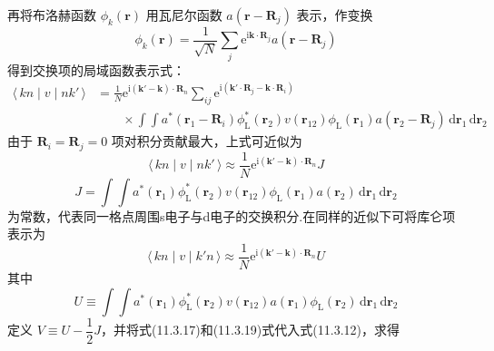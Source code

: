 再将布洛赫函数 $\phi_{k}(\boldsymbol{r})$ 用瓦尼尔函数 $a(\boldsymbol{r}-\boldsymbol{R}_{j})$ 表示，作变换
\begin{equation}
  \phi_{k}(\boldsymbol{r})=\frac{1}{\sqrt{N}}\sum_{j}
  \mathrm{e}^{\mathrm{i}\boldsymbol{k}\cdot\boldsymbol{R}_{j}}
  a(\boldsymbol{r}-\boldsymbol{R}_{j})
\end{equation}
得到交换项的局域函数表示式：
\begin{equation}
\begin{aligned}
  \langle\,kn\mid v\mid nk'\,\rangle
  &=\frac{1}{N}\mathrm{e}^{\mathrm{i}(\boldsymbol{k}'-\boldsymbol{k})\cdot\boldsymbol{R}_{n}}
  \sum_{ij}\mathrm{e}^{\mathrm{i}(\boldsymbol{k}'\cdot\boldsymbol{R}_{j}
  -\boldsymbol{k}\cdot\boldsymbol{R}_{i})}\\
  &\qquad\times\int\!\!\int a^{*}(\boldsymbol{r}_{1}-\boldsymbol{R}_{i})
  \phi^{*}_{\mathrm{L}}(\boldsymbol{r}_{2})v(\boldsymbol{r}_{12})
  \phi_{\mathrm{L}}(\boldsymbol{r}_{1})
  a(\boldsymbol{r}_{2}-\boldsymbol{R}_{j})
  \,\mathrm{d}\boldsymbol{r}_{1}\,\mathrm{d}\boldsymbol{r}_{2}
\end{aligned}
\end{equation}
由于 $\boldsymbol{R}_{i}=\boldsymbol{R}_{j}=0$ 项对积分贡献最大，上式可近似为
\begin{equation}
  \langle\,kn\mid v\mid nk'\,\rangle
  \approx\frac{1}{N}\mathrm{e}^{\mathrm{i}(\boldsymbol{k}'-\boldsymbol{k})\cdot\boldsymbol{R}_{n}}J
\end{equation}
\begin{equation}
  J=\int\!\!\int a^{*}(\boldsymbol{r}_{1})
  \phi^{*}_{\mathrm{L}}(\boldsymbol{r}_{2})v(\boldsymbol{r}_{12})
  \phi_{\mathrm{L}}(\boldsymbol{r}_{1})a(\boldsymbol{r}_{2})
  \,\mathrm{d}\boldsymbol{r}_{1}\,\mathrm{d}\boldsymbol{r}_{2}
\end{equation}
为常数，代表同一格点周围s电子与d电子的交换积分.在同样的近似下可将库仑项表示为
\begin{equation}
  \langle\,kn\mid v\mid k'n\,\rangle
  \approx\frac{1}{N}\mathrm{e}^{\mathrm{i}(\boldsymbol{k}'-\boldsymbol{k})\cdot\boldsymbol{R}_{n}}U
\end{equation}
其中
\begin{equation}
  U\equiv\int\!\!\int a^{*}(\boldsymbol{r}_{1})
  \phi^{*}_{\mathrm{L}}(\boldsymbol{r}_{2})v(\boldsymbol{r}_{12})
  a(\boldsymbol{r}_{1})\phi_{\mathrm{L}}(\boldsymbol{r}_{2})
  \,\mathrm{d}\boldsymbol{r}_{1}\,\mathrm{d}\boldsymbol{r}_{2}
\end{equation}
定义 $V\equiv U-\dfrac{1}{2}J$，并将式(11.3.17)和(11.3.19)式代入式(11.3.12)，求得
